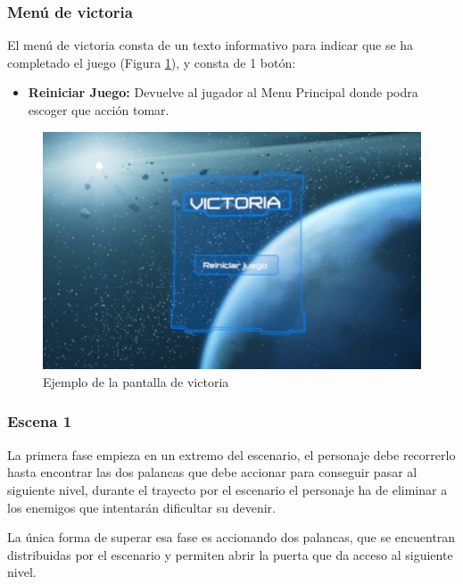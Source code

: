 \subsubsection{Menú de victoria}
El menú de victoria consta de un texto informativo para indicar que se ha completado el juego (Figura \ref{fig:MenuVictoria3D}), y consta de 1 botón:
\begin{itemize}
	\item \textbf{Reiniciar Juego:} Devuelve al jugador al Menu Principal donde podra escoger que acción tomar.
\end{itemize}

\begin{figure}[H]
	\centering
	\includegraphics[scale=0.85]{imagenes/MenuVictoria3D.png}
	\caption{\label{fig:MenuVictoria3D}Ejemplo de la pantalla de victoria}
\end{figure}

\subsubsection{Escena 1}
La primera fase empieza en un extremo del escenario, el personaje debe recorrerlo hasta encontrar las dos palancas que debe accionar para conseguir pasar al siguiente nivel, durante el trayecto por el escenario el personaje ha de eliminar a los enemigos que intentarán dificultar su devenir.

La única forma de superar esa fase es accionando dos palancas, que se encuentran distribuidas por el escenario y permiten abrir la puerta que da acceso al siguiente nivel.

